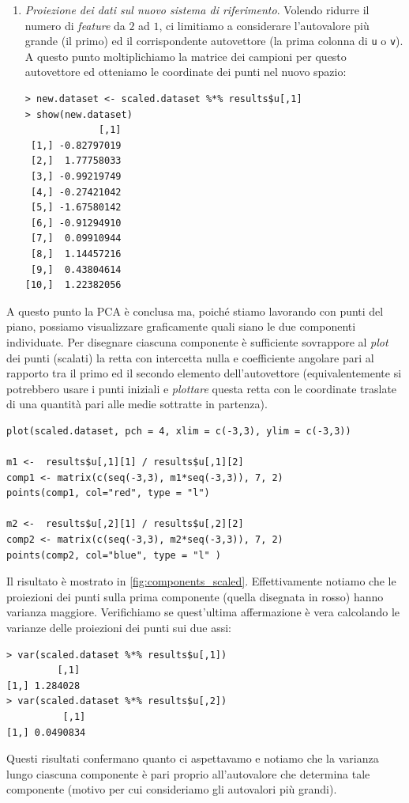 \begin{esempio}
\begin{enumerate}
\item \emph{Proiezione dei dati sul nuovo sistema di riferimento}. Volendo ridurre il numero di \emph{feature} da $2$ ad $1$, ci limitiamo a considerare l'autovalore più grande (il primo) ed il corrispondente autovettore (la prima colonna di \texttt{u} o \texttt{v}).
A questo punto moltiplichiamo la matrice dei campioni per questo autovettore ed otteniamo le coordinate dei punti nel nuovo spazio:
\begin{lstlisting}
> new.dataset <- scaled.dataset %*% results$u[,1] 
> show(new.dataset)
             [,1]
 [1,] -0.82797019
 [2,]  1.77758033
 [3,] -0.99219749
 [4,] -0.27421042
 [5,] -1.67580142
 [6,] -0.91294910
 [7,]  0.09910944
 [8,]  1.14457216
 [9,]  0.43804614
[10,]  1.22382056
\end{lstlisting}



\end{enumerate}

A questo punto la PCA è conclusa ma, poiché stiamo lavorando con punti del piano, possiamo visualizzare graficamente quali siano le due componenti individuate. Per disegnare ciascuna componente è sufficiente sovrappore al \emph{plot} dei punti (scalati) la retta con intercetta nulla e coefficiente angolare pari al rapporto tra il primo ed il secondo elemento dell'autovettore (equivalentemente si potrebbero usare i punti iniziali e \emph{plottare} questa retta con le coordinate traslate di una quantità pari alle medie sottratte in partenza).
\begin{lstlisting}
plot(scaled.dataset, pch = 4, xlim = c(-3,3), ylim = c(-3,3))

m1 <-  results$u[,1][1] / results$u[,1][2] 
comp1 <- matrix(c(seq(-3,3), m1*seq(-3,3)), 7, 2)
points(comp1, col="red", type = "l")

m2 <-  results$u[,2][1] / results$u[,2][2] 
comp2 <- matrix(c(seq(-3,3), m2*seq(-3,3)), 7, 2)
points(comp2, col="blue", type = "l" )
\end{lstlisting}
Il risultato è mostrato in \autoref{fig:components_scaled}. Effettivamente notiamo che le proiezioni dei punti sulla prima componente (quella disegnata in rosso) hanno varianza maggiore. Verifichiamo se quest'ultima affermazione è vera calcolando le varianze delle proiezioni dei punti sui due assi:
\begin{lstlisting}
> var(scaled.dataset %*% results$u[,1])
         [,1]
[1,] 1.284028
> var(scaled.dataset %*% results$u[,2])
          [,1]
[1,] 0.0490834
\end{lstlisting}
Questi risultati confermano quanto ci aspettavamo e notiamo che la varianza lungo ciascuna componente è pari proprio all'autovalore che determina tale componente (motivo per cui consideriamo gli autovalori più grandi).


\end{esempio}
